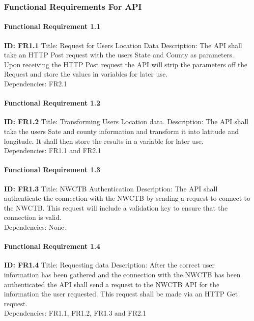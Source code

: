 \documentclass[onecolumn, draftclsnofoot,10pt, compsoc]{article}
\begin{document}
			\subsubsection{Functional Requirements For API}
					\paragraph{Functional Requirement 1.1}
						\textbf{ID: FR1.1} \hfill \break
						Title: Request for Users Location Data\hfill \break
						Description: The API shall take an HTTP Post request with the users State and County as parameters. Upon receiving the HTTP Post request the API will strip the parameters off the Request and store the values in variables for later use.\\
						Dependencies: FR2.1\hfill \break

					\paragraph{Functional Requirement 1.2}
						\textbf{ID: FR1.2}\hfill \break
						Title: Transforming Users Location data.\hfill \break
						Description: The API shall take the users Sate and county information and transform it into latitude and longitude. It shall then store the results in a variable for later use.\\
						Dependencies: FR1.1 and FR2.1\hfill \break

					\paragraph{Functional Requirement 1.3}
						\textbf{ID: FR1.3}\hfill \break
						Title: NWCTB Authentication
						Description: The API shall authenticate the connection with the NWCTB by sending a request to connect to the NWCTB. This request will include a validation key to ensure that the connection is valid.\\
						Dependencies: None.\hfill \break

					\paragraph{Functional Requirement 1.4}
						\textbf{ID: FR1.4}\hfill \break
						Title: Requesting data\hfill \break
						Description: After the correct user information has been gathered and the connection with the NWCTB has been authenticated the API shall send a request to the NWCTB API for the information the user requested. This request shall be made via an HTTP Get request.\\
						Dependencies: FR1.1, FR1.2, FR1.3 and FR2.1\hfill \break
\end{document}
